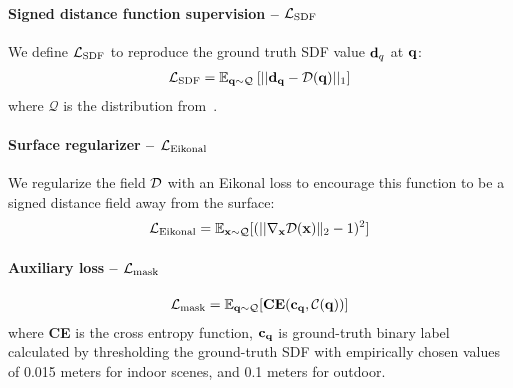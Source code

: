 \paragraph{Signed distance function supervision -- $\mathcal{L}_\text{SDF}$}
We define $\mathcal{L}_\text{SDF}$ to reproduce the ground truth SDF value $\mathbf{d}_q$ at $\mathbf{q}$:
\begin{align*}
\mathcal{L}_\text{SDF} = \mathbb{E}_{\mathbf{q}\sim\mathcal{Q}} 
\:
[|| \mathbf{d}_{\mathbf{q}} - \mathcal{D}(\mathbf{q}) ||_1]    
\end{align*}
where $\mathcal{Q}$ is the distribution from~\citet{huang2023neural}.

\paragraph{Surface regularizer -- $\mathcal{L}_\text{Eikonal}$}
We regularize the field $\mathcal{D}$ with an Eikonal loss to encourage this function to be a signed distance field away from the surface: 
\begin{align}
    \mathcal{L}_\text{Eikonal} = \mathbb{E}_{\mathbf{x} \sim \mathcal{Q}} [(||\nabla_{\mathbf{x}} \mathcal{D}(\mathbf{x})\|_2 - 1)^2 ]
\end{align}

\paragraph{Auxiliary loss -- $\mathcal{L}_\text{mask}$}  
\begin{align*}
\mathcal{L}_\text{mask} = \mathbb{E}_{\mathbf{q}\sim\mathcal{Q}} [\textbf{CE}(\mathbf{c}_{\mathbf{q}}, \mathcal{C}(\mathbf{q})
)] 
\end{align*}
where \textbf{CE} is the cross entropy function, $\mathbf{c}_{\mathbf{q}}$ is ground-truth binary label calculated by thresholding the ground-truth SDF with empirically chosen values of 0.015 meters for indoor scenes, and 0.1 meters for outdoor.

